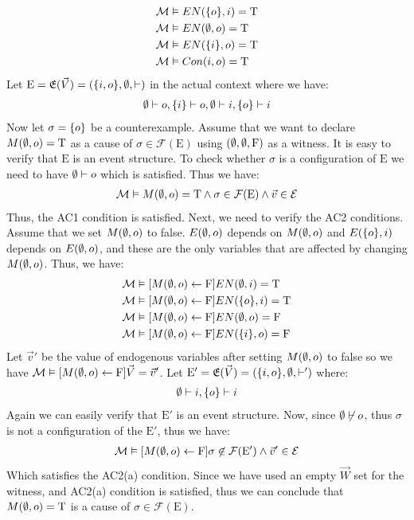 \begin{example}
\begin{align*}
        \mathcal{M} & \vDash EN(\{o\},i) = \mathrm{T} \\
        \mathcal{M} & \vDash EN(\emptyset,o) = \mathrm{T}    \\
        \mathcal{M} & \vDash EN(\{i\},o) = \mathrm{T} \\
        \mathcal{M} & \vDash Con(i,o) = \mathrm{T}    \\
    \end{align*}
    Let $\mathrm{E} = \mathfrak{E}(\vec V) = (\{i,o\},\emptyset,\vdash)$ 
    in the actual context where we have:
    \begin{align*}
        \emptyset \vdash o, \{i\} \vdash o, \emptyset \vdash i, \{o\} \vdash i
    \end{align*}
    Now let $\sigma = \{o\}$ be a counterexample.     
    Assume that we want to declare $M(\emptyset,o) = \mathrm{T}$ as a cause of 
    $\sigma \in \mathcal{F}(\mathrm{E})$ using $(\emptyset,\emptyset,\mathrm{F})$ as a witness.
    It is easy to verify that $\mathrm{E}$ is an event structure.
    To check whether $\sigma$ is a configuration of $\mathrm{E}$ we need
    to have $\emptyset \vdash o$ which is satisfied.
    Thus we have:
    \begin{align*}
        \mathcal{M} \vDash M(\emptyset,o) = \mathrm{T} \wedge \sigma \in \mathcal{F}(\mathrm{E}) \wedge \vec v \in \mathcal{E}
    \end{align*}
    Thus, the AC1 condition is satisfied.
    Next, we need to verify the AC2 conditions.
    Assume that we set $M(\emptyset,o)$ to false.
    $E(\emptyset,o)$ depends on $M(\emptyset,o)$ and $E(\{o\},i)$ depends on $E(\emptyset,o)$,
    and these are the only variables that are affected by changing $M(\emptyset,o)$.
    Thus, we have:
    \begin{align*}
        \mathcal{M} & \vDash [M(\emptyset,o)\leftarrow \mathrm{F}] EN(\emptyset,i) = \mathrm{T} \\
        \mathcal{M} & \vDash [M(\emptyset,o)\leftarrow \mathrm{F}] EN(\{o\},i) = \mathrm{T} \\
        \mathcal{M} & \vDash [M(\emptyset,o)\leftarrow \mathrm{F}] EN(\emptyset,o) = \mathrm{F} \\
        \mathcal{M} & \vDash [M(\emptyset,o)\leftarrow \mathrm{F}] EN(\{i\},o) = \mathrm{F} 
    \end{align*}
    Let $\vec v'$ be the value of endogenous variables after setting 
    $M(\emptyset,o)$ to false so we have $\mathcal{M} \vDash [M(\emptyset,o)\leftarrow \mathrm{F}]\vec V = \vec v'$.
    Let $\mathrm{E}' = \mathfrak{E}(\vec V) = (\{i,o\},\emptyset, \vdash')$ where:
    \begin{align*}
        \emptyset \vdash i, \{o\} \vdash i
    \end{align*}
    Again we can easily verify that $\mathrm{E}'$ is an event structure.
    Now, since $\emptyset \not \vdash o$, thus $\sigma$ is not a configuration of
    the $\mathrm{E}'$, thus we have:
    \begin{align*}
        \mathcal{M} \vDash [M(\emptyset,o) \leftarrow \mathrm{F}] \sigma \not \in \mathcal{F}(\mathrm{E'})
        \wedge \vec v' \in \mathcal{E}
    \end{align*}
    Which satisfies the AC2(a) condition.
    Since we have used an empty $\vec W$ set for the witness, and AC2(a)
    condition is satisfied, thus we can conclude that $M(\emptyset,o) = \mathrm{T}$ is a 
    cause of $\sigma \in \mathcal{F}(\mathrm{E})$.
\end{example}

